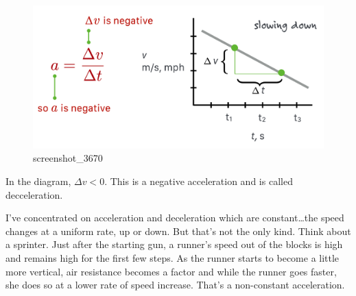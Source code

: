 \documentclass[
  letterpaper,
  DIV=11,
  numbers=noendperiod,
  oneside]{scrreprt}
\begin{document}
\begin{figure}[H]

{\centering \includegraphics[width=0.8\linewidth,height=\textheight,keepaspectratio]{mechanics/motion/screenshot_3670.png}

}

\caption{screenshot\_3670}

\end{figure}%

In the diagram, \(\Delta v < 0\). This is a negative acceleration and is
called decceleration.

I've concentrated on acceleration and deceleration which are
constant\ldots the speed changes at a uniform rate, up or down. But
that's not the only kind. Think about a sprinter. Just after the
starting gun, a runner's speed out of the blocks is high and remains
high for the first few steps. As the runner starts to become a little
more vertical, air resistance becomes a factor and while the runner goes
faster, she does so at a lower rate of speed increase. That's a
non-constant acceleration.

\end{document}
